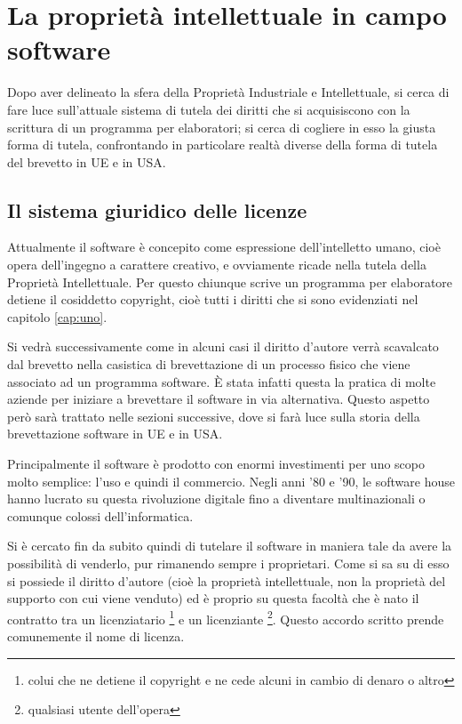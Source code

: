 \chapter{La proprietà intellettuale in campo software}
Dopo aver delineato la sfera della Proprietà Industriale e Intellettuale, si cerca di fare luce sull'attuale sistema di tutela dei diritti che si acquisiscono con la scrittura di un programma per elaboratori; si cerca di cogliere in esso la giusta forma di tutela,  confrontando in particolare realtà diverse della forma di tutela del brevetto in UE e in USA.

\section{Il sistema giuridico delle licenze} \label{sec:sistema-licenze}
Attualmente il software è concepito come espressione dell'intelletto umano, cioè opera dell'ingegno a carattere creativo, e ovviamente ricade nella tutela della Proprietà Intellettuale. Per questo chiunque scrive un programma per elaboratore detiene il cosiddetto copyright, cioè tutti i diritti che si sono evidenziati nel capitolo \ref{cap:uno}.

Si vedrà successivamente come in alcuni casi il diritto d'autore verrà scavalcato dal brevetto nella casistica di brevettazione di un processo fisico che viene associato ad un programma software. \`E stata infatti questa la pratica di molte aziende per iniziare a brevettare il software in via alternativa. Questo aspetto però sarà trattato nelle sezioni successive, dove si farà luce sulla storia della brevettazione software in UE e in USA.

Principalmente il software è prodotto con enormi investimenti per uno scopo molto semplice: l'uso e quindi il commercio. Negli anni '80 e '90, le software house hanno lucrato su questa rivoluzione digitale fino a diventare multinazionali o comunque colossi dell'informatica.

Si è cercato fin da subito quindi di tutelare il software in maniera tale da avere la possibilità di venderlo, pur rimanendo sempre i proprietari. Come si sa su di esso si possiede il diritto d'autore (cioè la proprietà intellettuale, non la proprietà del supporto con cui viene venduto) ed è proprio su questa facoltà che è nato il contratto tra un licenziatario \footnote{colui che ne detiene il copyright e ne cede alcuni in cambio di denaro o altro} e un licenziante \footnote{qualsiasi utente dell'opera}. Questo accordo scritto prende comunemente il nome di licenza.

